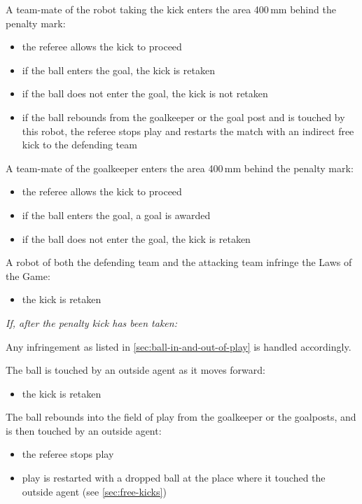 A team-mate of the robot taking the kick enters the area 400\,mm behind the penalty mark:

\begin{itemize}
\item the referee allows the kick to proceed
\item if the ball enters the goal, the kick is retaken
\item if the ball does not enter the goal, the kick is not retaken
\item if the ball rebounds from the goalkeeper or the goal post and is  touched by this robot, the referee stops play and restarts the match with an indirect free kick to the defending team
\end{itemize}

A team-mate of the goalkeeper enters the area 400\,mm behind the penalty mark:

\begin{itemize}
\item the referee allows the kick to proceed
\item if the ball enters the goal, a goal is awarded
\item if the ball does not enter the goal, the kick is retaken
\end{itemize}

A robot of both the defending team and the attacking team infringe the Laws of the Game:

\begin{itemize}
\item the kick is retaken
\end{itemize}

\textit{If, after the penalty kick has been taken:}

Any infringement as listed in \autoref{sec:ball-in-and-out-of-play} is handled accordingly.

The ball is touched by an outside agent as it moves forward:

\begin{itemize}
\item the kick is retaken
\end{itemize}

The ball rebounds into the field of play from the goalkeeper or the goalposts, and is then touched by an outside agent:

\begin{itemize}
\item the referee stops play
\item play is restarted with a dropped ball at the place where it touched the outside agent (see \autoref{sec:free-kicks})
\end{itemize}

